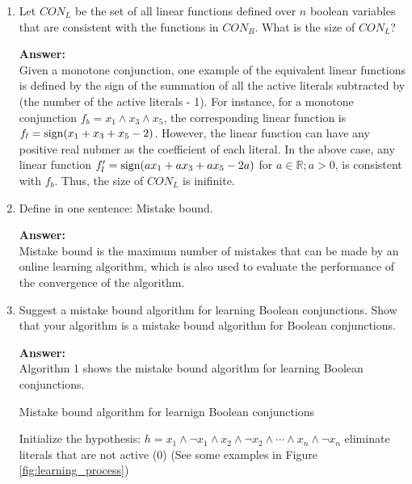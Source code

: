 \begin{enumerate}
{\bf Answer:}\\
For every variable, there are two cases, active or not active. Thus, the size of $CON_B$ is $2^n$. 

\item Let $CON_L$ be the set of all linear functions defined over $n$ boolean variables that are consistent with the functions in $CON_B$. What is the size of $CON_L$?

{\bf Answer:}\\
Given a monotone conjunction, one example of the equivalent linear functions is defined by the sign of the summation of all the active literals subtracted by (the number of the active literals - 1). For instance, for a monotone conjunction $f_b = x_1 \wedge x_3 \wedge x_5$, the corresponding linear function is $f_l = {\rm sign}(x_1 + x_3 + x_5 - 2)$. However, the linear function can have any positive real nubmer as the coefficient of each literal. In the above case, any linear function $f_l^\prime = {\rm sign}(a x_1 + a x_3 + a x_5 - 2a)$ for $a \in \mathbb{R}; a > 0$, is consistent with $f_b$. Thus, the size of $CON_L$ is inifinite.

\item Define in one sentence: Mistake bound.

{\bf Answer:}\\
Mistake bound is the maximum number of mistakes that can be made by an online learning algorithm, which is also used to evaluate the performance of the convergence of the algorithm. 

\item Suggest a mistake bound algorithm for learning Boolean conjunctions. Show that your algorithm is a mistake bound algorithm for Boolean conjunctions.

{\bf Answer:}\\
Algorithm 1 shows the mistake bound algorithm for learning Boolean conjunctions.

\begin{algorithm}
\caption{Mistake bound algorithm for learnign Boolean conjunctions}\label{euclid}
\begin{algorithmic}[1]
\State Initialize the hypothesis: $h =  x_1 \wedge \neg x_1 \wedge x_2 \wedge \neg x_2 \wedge \cdots \wedge x_n \wedge \neg x_n$
\State eliminate literals that are not active (0) \hspace*{\fill} (See some examples in Figure \ref{fig:learning_process})
\EndIf
\EndFor
\EndProcedure
\end{algorithmic}
\end{algorithm}




\end{enumerate}

